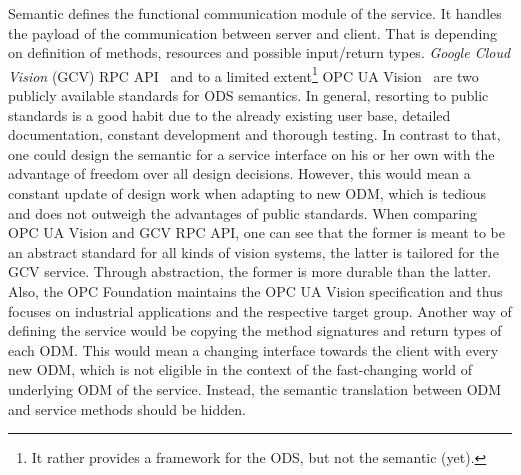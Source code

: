 \begin{table}[ht]
\begin{center}
\begin{minipage}{\textwidth}
      \end{minipage}
    \end{center}
\end{table}%


Semantic defines the functional communication module of the service. It handles the payload of the communication between server and client. That is depending on definition of methods, resources and possible input/return types. \textit{Google Cloud Vision} (GCV) RPC API~\cite{Google-Cloud-Documentation2018Cloud2018} and to a limited extent\footnote{It rather provides a framework for the ODS, but not the semantic (yet).} OPC UA Vision~\cite{VDMA2018OPC40100-1:2018-11} are two publicly available standards for ODS semantics. In general, resorting to public standards is a good habit due to the already existing user base, detailed documentation, constant development and thorough testing. In contrast to that, one could design the semantic for a service interface on his or her own with the advantage of freedom over all design decisions. However, this would mean a constant update of design work when adapting to new ODM, which is tedious and does not outweigh the advantages of public standards. When comparing OPC UA Vision and GCV RPC API, one can see that the former is meant to be an abstract standard for all kinds of vision systems, the latter is tailored for the GCV service. Through abstraction, the former is more durable than the latter. Also, the OPC Foundation maintains the OPC UA Vision specification and thus focuses on industrial applications and the respective target group. Another way of defining the service would be copying the method signatures and return types of each ODM. This would mean a changing interface towards the client with every new ODM, which is not eligible in the context of the fast-changing world of underlying ODM of the service. Instead, the semantic translation between ODM and service methods should be hidden. 

